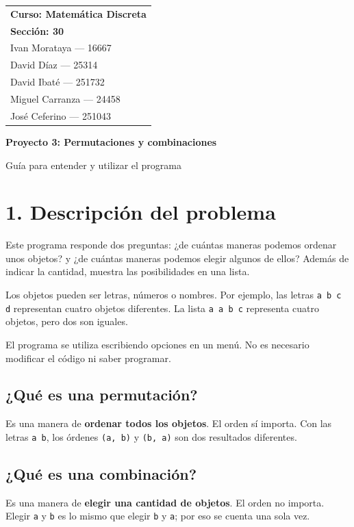 \documentclass[11pt,a4paper]{article}
\begin{document}
{\small
\begin{tabular}{@{}l@{}}
\textbf{Curso: Matemática Discreta} \\
\textbf{Sección: 30} \\
Ivan Morataya --- 16667 \\
David Díaz --- 25314 \\
David Ibaté --- 251732 \\
Miguel Carranza --- 24458 \\
José Ceferino --- 251043
\end{tabular}\par
}
\vspace{0.5em}
{\large\bfseries Proyecto 3: Permutaciones y combinaciones}\par
Guía para entender y utilizar el programa


\section*{1. Descripción del problema}
Este programa responde dos preguntas: ¿de cuántas maneras podemos ordenar
unos objetos? y ¿de cuántas maneras podemos elegir algunos de ellos?
Además de indicar la cantidad, muestra las posibilidades en una lista.

Los objetos pueden ser letras, números o nombres. Por ejemplo, las letras
\texttt{a b c d} representan cuatro objetos diferentes. La lista
\texttt{a a b c} representa cuatro objetos, pero dos son iguales.

El programa se utiliza escribiendo opciones en un menú. No es necesario
modificar el código ni saber programar.

\subsection*{¿Qué es una permutación?}
Es una manera de \textbf{ordenar todos los objetos}. El orden sí importa.
Con las letras \texttt{a b}, los órdenes \texttt{(a, b)} y
\texttt{(b, a)} son dos resultados diferentes.

\subsection*{¿Qué es una combinación?}
Es una manera de \textbf{elegir una cantidad de objetos}. El orden no importa.
Elegir \texttt{a} y \texttt{b} es lo mismo que elegir \texttt{b} y
\texttt{a}; por eso se cuenta una sola vez.
\end{document}
